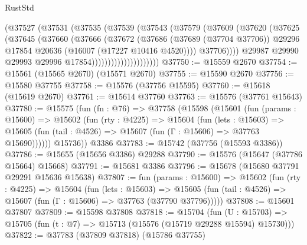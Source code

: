 \begin{lexlean}{RustStd}
\begin{coremodule}
                              (@37527
                                (@37531
                                  (@37535
                                    (@37539
                                      (@37543
                                        (@37579
                                          (@37609
                                            (@37620
                                              (@37625
                                                (@37645
                                                  (@37660
                                                    (@37666
                                                      (@37672
                                                        (@37686
                                                          (@37689 (@37704 @37706))
                                                          @29296
                                                          @17854
                                                          @20636
                                                          (@16007 (@17227 @10416 @4520))))
                                                      @37706))))
                                              @29987
                                              @29990
                                              @29993
                                              @29996
                                              @17854)))))))))))))))))))))
@37750 := @15559 @2670
@37754 := @15561 (@15565 @2670) (@15571 @2670)
@37755 := @15590 @2670
@37756 := @15580 @37755
@37758 := @15576 (@37756 @15595)
@37760 := @15618 (@15619 @2670)
@37761 := @15614 @37760
@37763 := @15576 (@37761 @15643)
@37780 := @15575
    (fun (fn : @76) =>
    @37758
      (@15598
        (@15601
          (fun (params : @15600) =>
          @15602
            (fun (rty : @4225) =>
            @15604
              (fun (lets : @15603) =>
              @15605 (fun (tail : @4526) => @15607 (fun (Γ : @15606) => @37763 @15690))))))
        @15736))
    @3386
@37783 := @15742 (@37756 (@15593 @3386))
@37786 := @15655 (@15656 @3386) @29288
@37790 := @15576 (@15647 (@37786 @15664) @15668)
@37791 := @15681 @3386
@37796 := @15678 (@15680 @37791 @29291 @15636 @15638)
@37807 := fun (params : @15600) =>
  @15602
    (fun (rty : @4225) =>
    @15604
      (fun (lets : @15603) =>
      @15605 (fun (tail : @4526) => @15607 (fun (Γ : @15606) => @37763 (@37790 @37796)))))
@37808 := @15601 @37807
@37809 := @15598 @37808
@37818 := @15704
    (fun (U : @15703) => @15705 (fun (t : @7) => @15713 (@15576 (@15719 @29288 @15594) @15730)))
@37822 := @37783 (@37809 @37818) (@15786 @37755)

\end{coremodule}
\end{lexlean}
